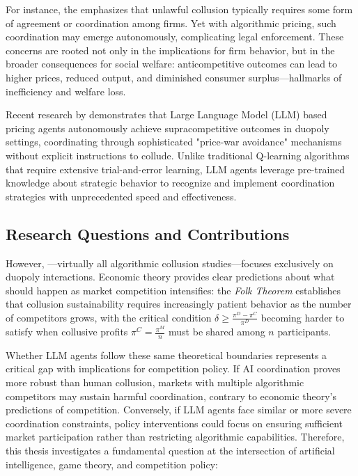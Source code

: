 For instance, the \textcite{us_department_of_justice_price_2021} emphasizes that unlawful collusion typically requires some form of agreement or coordination among firms. Yet with algorithmic pricing, such coordination may emerge autonomously, complicating legal enforcement. These concerns are rooted not only in the implications for firm behavior, but in the broader consequences for social welfare: anticompetitive outcomes can lead to higher prices, reduced output, and diminished consumer surplus—hallmarks of inefficiency and welfare loss.

Recent research by \textcite{fish_algorithmic_2025} demonstrates that Large Language Model (LLM) based pricing agents autonomously achieve supracompetitive outcomes in duopoly settings, coordinating through sophisticated "price-war avoidance" mechanisms without explicit instructions to collude. Unlike traditional Q-learning algorithms that require extensive trial-and-error learning, LLM agents leverage pre-trained knowledge about strategic behavior to recognize and implement coordination strategies with unprecedented speed and effectiveness.


\subsection{Research Questions and Contributions}
However, \textcite{fish_algorithmic_2025}—virtually all algorithmic collusion studies—focuses exclusively on duopoly interactions. Economic theory provides clear predictions about what should happen as market competition intensifies: the \emph{Folk Theorem} establishes that collusion sustainability requires increasingly patient behavior as the number of competitors grows, with the critical condition $\delta \geq \frac{\pi^D - \pi^C}{\pi^D}$ becoming harder to satisfy when collusive profits $\pi^C = \frac{\pi^M}{n}$ must be shared among $n$ participants.

Whether LLM agents follow these same theoretical boundaries represents a critical gap with implications for competition policy. If AI coordination proves more robust than human collusion, markets with multiple algorithmic competitors may sustain harmful coordination, contrary to economic theory's predictions of competition. Conversely, if LLM agents face similar or more severe coordination constraints, policy interventions could focus on ensuring sufficient market participation rather than restricting algorithmic capabilities. Therefore, this thesis investigates a fundamental question at the intersection of artificial intelligence, game theory, and competition policy:

